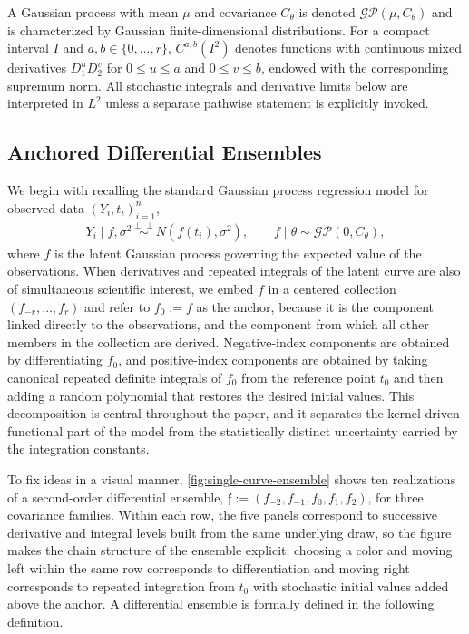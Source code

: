 \documentclass[11pt,a4paper]{article}
\theoremstyle{definition}
\theoremstyle{remark}
\newcommand{\indep}{\perp\!\!\!\perp}
\begin{document}
A Gaussian process with mean $\mu$ and covariance $C_\theta$ is denoted $\mathcal{GP}(\mu,C_\theta)$ and is characterized by Gaussian finite-dimensional distributions. For a compact interval $I$ and $a,b\in\{0,\ldots,r\}$, $C^{a,b}(I^2)$ denotes functions with continuous mixed derivatives $D_1^uD_2^v$ for $0\le u\le a$ and $0\le v\le b$, endowed with the corresponding supremum norm. All stochastic integrals and derivative limits below are interpreted in $L^2$ unless a separate pathwise statement is explicitly invoked.




\subsection{Anchored Differential Ensembles}\label{sec:anchored-ensembles}


We begin with recalling the standard Gaussian process regression model for observed data $(Y_i, t_i)_{i=1}^n$,
\begin{align*}
Y_i \mid f, \sigma^2 \overset{\indep}{\sim} N(f(t_i), \sigma^2), \qquad f \mid \theta \sim \mathcal{GP}(0, C_\theta),
\end{align*}
where $f$ is the latent Gaussian process governing the expected value of the observations. When derivatives and repeated integrals of the latent curve are also of simultaneous scientific interest, we embed $f$ in a centered collection $(f_{-r}, \ldots, f_r)$ and refer to $f_0 := f$ as the anchor, because it is the component linked directly to the observations, and the component from which all other members in the collection are derived. Negative-index components are obtained by differentiating $f_0$, and positive-index components are obtained by taking canonical repeated definite integrals of $f_0$ from the reference point $t_0$ and then adding a random polynomial that restores the desired initial values. This decomposition is central throughout the paper, and it separates the kernel-driven functional part of the model from the statistically distinct uncertainty carried by the integration constants.

To fix ideas in a visual manner, \cref{fig:single-curve-ensemble} shows ten realizations of a second-order differential ensemble, $\mathfrak{f} := (f_{-2}, f_{-1},f_0,f_1, f_{2})$, for three covariance families. Within each row, the five panels correspond to successive derivative and integral levels built from the same underlying draw, so the figure makes the chain structure of the ensemble explicit: choosing a color and moving left within the same row corresponds to differentiation and moving right corresponds to repeated integration from \(t_0\) with stochastic initial values added above the anchor. A differential ensemble is formally defined in the following definition.
\end{document}
